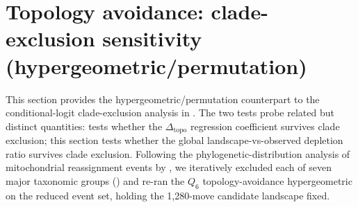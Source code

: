 \documentclass[preprint,11pt,authoryear,a4paper]{elsarticle}
\begin{document}
\protect{}\label{fig:s-per-table}{}

\section{Topology avoidance: clade-exclusion sensitivity
(hypergeometric/permutation)}\label{sec:s-clade}

This section provides the hypergeometric/permutation counterpart to the
conditional-logit clade-exclusion analysis in
. The two tests probe related but distinct
quantities:  tests whether the
\(\Delta_{\text{topo}}\) regression coefficient survives clade
exclusion; this section tests whether the global landscape-vs-observed
depletion ratio survives clade exclusion. Following the
phylogenetic-distribution analysis of mitochondrial reassignment events
by \citep{sengupta2007}, we iteratively excluded each of seven major
taxonomic groups () and re-ran the \(Q_{6}\)
topology-avoidance hypergeometric on the reduced event set, holding the
1,280-move candidate landscape fixed.
\end{document}
